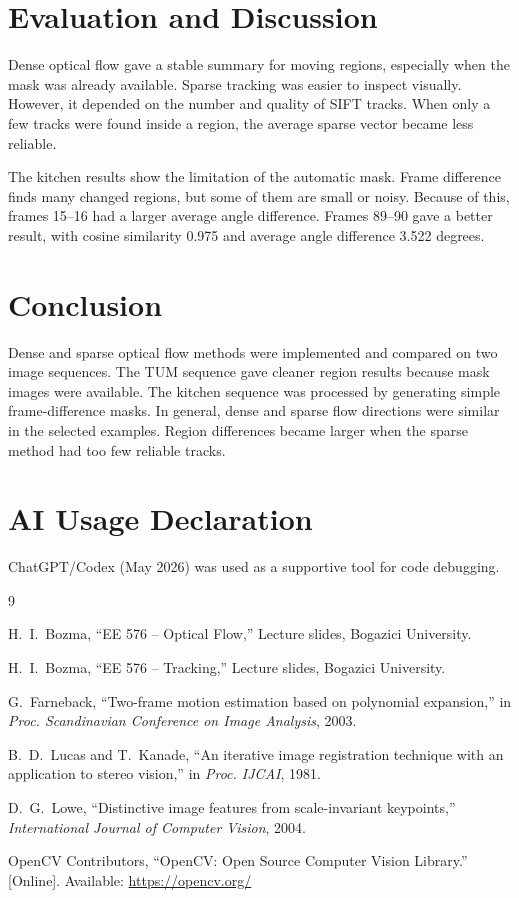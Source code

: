 \documentclass[conference]{IEEEtran}
\begin{document}
\section{Evaluation and Discussion}

Dense optical flow gave a stable summary for moving regions, especially when the mask was already available. Sparse tracking was easier to inspect visually. However, it depended on the number and quality of SIFT tracks. When only a few tracks were found inside a region, the average sparse vector became less reliable.

The kitchen results show the limitation of the automatic mask. Frame difference finds many changed regions, but some of them are small or noisy. Because of this, frames 15--16 had a larger average angle difference. Frames 89--90 gave a better result, with cosine similarity 0.975 and average angle difference 3.522 degrees.

\section{Conclusion}

Dense and sparse optical flow methods were implemented and compared on two image sequences. The TUM sequence gave cleaner region results because mask images were available. The kitchen sequence was processed by generating simple frame-difference masks. In general, dense and sparse flow directions were similar in the selected examples. Region differences became larger when the sparse method had too few reliable tracks.

\section*{AI Usage Declaration}

ChatGPT/Codex (May 2026) was used as a supportive tool
for code debugging.

\begin{thebibliography}{9}

H.~I.~Bozma, ``EE 576 -- Optical Flow,'' Lecture slides, Bogazici University.

H.~I.~Bozma, ``EE 576 -- Tracking,'' Lecture slides, Bogazici University.

G.~Farneback, ``Two-frame motion estimation based on polynomial expansion,'' in \textit{Proc. Scandinavian Conference on Image Analysis}, 2003.

B.~D.~Lucas and T.~Kanade, ``An iterative image registration technique with an application to stereo vision,'' in \textit{Proc. IJCAI}, 1981.

D.~G.~Lowe, ``Distinctive image features from scale-invariant keypoints,'' \textit{International Journal of Computer Vision}, 2004.

OpenCV Contributors, ``OpenCV: Open Source Computer Vision Library.'' [Online]. Available: \url{https://opencv.org/}

\end{thebibliography}
\end{document}
